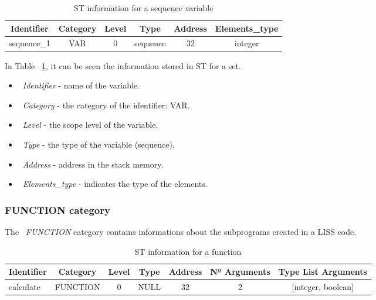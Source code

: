 \documentclass[
  oneside,
  11pt, a4paper,
  footinclude=true,
  headinclude=true,
  cleardoublepage=empty
]{scrbook}
\begin{document}
\begin{table}[h!]
\centering
\caption{ST information for a sequence variable}
\label{tbl:var_sequence_information}
\begin{tabular}{l|c|c|c|c|l}
\multicolumn{1}{c|}{Identifier} & Category & Level & Type     & Address & Elements\_type              \\ \hline
sequence\_1                     & VAR      & 0     & sequence & 32      & \multicolumn{1}{c}{integer}
\end{tabular}
\end{table}

In Table ~\ref{tbl:var_sequence_information}, it can be seen the information stored in ST for a set.
\begin{itemize}
\item ~\textit{Identifier} - name of the variable.
\item ~\textit{Category} - the category of the identifier: VAR.
\item ~\textit{Level} - the scope level of the variable.
\item ~\textit{Type} - the type of the variable (sequence).
\item ~\textit{Address} - address in the stack memory.
\item ~\textit{Elements\_type} - indicates the type of the elements.
\end{itemize}

\subsubsection{FUNCTION category}

The ~\textit{FUNCTION} category contains informations about the subprograms created in a LISS code.

\begin{table}[h!]
\centering
\caption{ST information for a function}
\label{tbl:function_information}
\begin{tabular}{l|c|c|c|c|c|c}
\multicolumn{1}{c|}{Identifier} & Category & Level & Type & Address & Nº Arguments & Type List Arguments    \\ \hline
calculate                       & FUNCTION & 0     & NULL & 32      & 2            & {[}integer, boolean{]}
\end{tabular}
\end{table}
\end{document}
